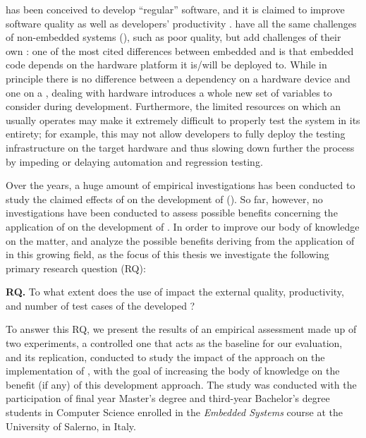 \tdd has been conceived to develop “regular” software, and it is claimed to improve software quality as well as developers' productivity \cite{DBLP:reference/se/ErdogmusMJ10}. \ess have all the same challenges of non-embedded systems (\noess), such as poor quality, but add challenges of their own \cite{TDDEC}: one of the most cited differences between embedded and \noess is that embedded code depends on the hardware platform it is/will be deployed to. 
While in principle there is no difference between a dependency on a hardware device and one on a \noess \cite{TDDEC}, dealing with hardware introduces a whole new set of variables to consider during development. Furthermore, the limited resources on which an \es usually operates may make it extremely difficult to properly test the system in its entirety; for example, this may not allow developers to fully deploy the testing infrastructure on the target hardware and thus slowing down further the process by impeding or delaying automation and regression testing.

Over the years, a huge amount of empirical investigations has been conducted to study the claimed effects of \tdd on the development of \noess (\eg \cite{DBLP:journals/software/KaracT18}). So far, however, no investigations have been conducted to assess possible benefits concerning the application of \tdd on the development of \ess. In order to improve our body of knowledge on the matter, and analyze the possible benefits deriving from the application of \tdd in this growing field, as the focus of this thesis we investigate the following primary research question (RQ):

\begin{framed}
\noindent \textbf{RQ.} To what extent does the use of \tdd impact the external quality, productivity, and number of test cases of the developed \es?	
\end{framed}

To answer this RQ, we present the results of an empirical assessment made up of two experiments, a controlled one that acts as the baseline for our evaluation, and its replication, conducted to study the impact of the \tdd approach on the implementation of \ess, with the goal of increasing the body of knowledge on the benefit (if any) of this development approach.
The study was conducted with the participation of final year Master's degree and third-year Bachelor's degree students in Computer Science enrolled in the \textit{Embedded Systems} course at the University of Salerno, in Italy. 

